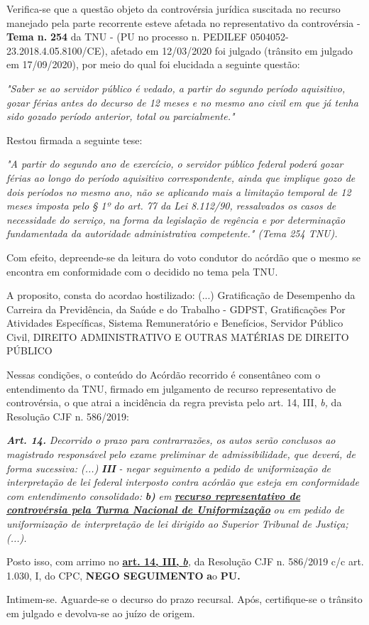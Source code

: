 \documentclass[12pt]{article}
\begin{document}
\justifying
\noindent Verifica-se que a questão objeto da controvérsia jurídica suscitada no recurso manejado pela parte recorrente esteve afetada no representativo da controvérsia - \textbf{Tema n. }\textbf{254} da TNU - (PU no processo n. PEDILEF 0504052-23.2018.4.05.8100/CE),  afetado em 12/03/2020 foi julgado (trânsito em julgado em 17/09/2020), por meio do qual foi elucidada a seguinte questão:

\noindent \textit{"Saber se ao servidor público é vedado, a partir do segundo período aquisitivo, gozar férias antes do decurso de 12 meses e no mesmo ano civil em que já tenha sido gozado período anterior, total ou parcialmente."}

\noindent Restou firmada a seguinte tese:

\noindent \textit{"A partir do segundo ano de exercício, o servidor público federal poderá gozar férias ao longo do período aquisitivo correspondente, ainda que implique gozo de dois períodos no mesmo ano, não se aplicando mais a limitação temporal de 12 meses imposta pelo § 1º do art. 77 da Lei 8.112/90, ressalvados os casos de necessidade do serviço, na forma da legislação de regência e por determinação fundamentada da autoridade administrativa competente." (Tema 254 TNU).}

\noindent Com efeito, depreende-se da leitura do voto condutor do acórdão que o mesmo se encontra em conformidade com o decidido no  tema pela TNU.

\noindent A proposito, consta do acordao hostilizado: (...) Gratificação de Desempenho da Carreira da Previdência, da Saúde e do Trabalho - GDPST, Gratificações Por Atividades Específicas, Sistema Remuneratório e Benefícios, Servidor Público Civil, DIREITO ADMINISTRATIVO E OUTRAS MATÉRIAS DE DIREITO PÚBLICO

\noindent Nessas condições, o conteúdo do Acórdão recorrido é consentâneo com o entendimento da TNU, firmado em julgamento de recurso representativo de controvérsia, o que atrai a incidência da regra prevista pelo art. 14, III, \textit{b,} da Resolução CJF n. 586/2019:

\noindent \textit{\textbf{Art. 14.}}\textit{ Decorrido o prazo para contrarrazões, os autos serão conclusos ao magistrado responsável pelo exame preliminar de admissibilidade, que deverá, de forma sucessiva: (...) }\textit{\textbf{III }}\textit{- negar seguimento a pedido de uniformização de interpretação de lei federal interposto contra acórdão que esteja em conformidade com entendimento consolidado: }\textit{\textbf{b)}}\textit{ em }\uline{\textit{\textbf{recurso representativo de controvérsia pela Turma Nacional de Uniformização}}}\textit{ ou em pedido de uniformização de interpretação de lei dirigido ao Superior Tribunal de Justiça;(...).}

\noindent Posto isso, com arrimo no \uline{\textbf{art. 14, III, }}\uline{\textit{\textbf{b}}}\textit{,} da Resolução CJF n. 586/2019 c/c art. 1.030, I, do CPC, \textbf{NEGO SEGUIMENTO }\textbf{a}o\textbf{ PU}\textbf{.}

\noindent Intimem-se. Aguarde-se o decurso do prazo recursal. Após, certifique-se o trânsito em julgado e devolva-se ao juízo de origem.
\end{document}
